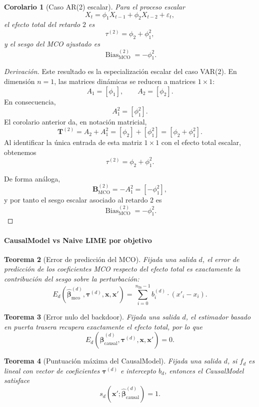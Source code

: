 \documentclass[12pt]{report} %
\newtheorem{theorem}{Teorema}
\newtheorem{corollary}[theorem]{Corolario}
\begin{document}
\begin{corollary}[Caso AR(2) escalar]
    Para el proceso escalar
    $$X_t = \phi_1 X_{t-1} + \phi_2 X_{t-2} + \varepsilon_t,$$
    el efecto total del retardo $2$ es
    $$\tau^{(2)} = \phi_2 + \phi_1^2,$$
    y el sesgo del MCO ajustado es
    $$\operatorname{Bias}_{\mathrm{MCO}}^{(2)} = -\phi_1^2.$$
\end{corollary}
\begin{proof}[Derivación]
    Este resultado es la especialización escalar del caso VAR(2). En dimensión $n=1$, las matrices dinámicas se reducen a matrices $1 \times 1$:
    $$A_1 = [\phi_1], \qquad A_2 = [\phi_2].$$
    En consecuencia,
    $$A_1^2 = [\phi_1^2].$$
    El corolario anterior da, en notación matricial,
    $$\mathbf{T}^{(2)} = A_2 + A_1^2 = [\phi_2] + [\phi_1^2] = [\phi_2 + \phi_1^2].$$
    Al identificar la única entrada de esta matriz $1 \times 1$ con el efecto total escalar, obtenemos
    $$\tau^{(2)} = \phi_2 + \phi_1^2.$$

    De forma análoga,
    $$\mathbf{B}_{\mathrm{MCO}}^{(2)} = -A_1^2 = [-\phi_1^2],$$
    y por tanto el sesgo escalar asociado al retardo $2$ es
    $$\operatorname{Bias}_{\mathrm{MCO}}^{(2)} = -\phi_1^2.$$
\end{proof}

\paragraph{CausalModel vs Naive LIME por objetivo}

\begin{theorem}[Error de predicción del MCO]
    Fijada una salida $d$, el error de predicción de los coeficientes MCO respecto del efecto total es exactamente la contribución del sesgo sobre la perturbación:
    $$E_d\!\left(\widehat{\boldsymbol{\beta}}^{(d)}_{\text{mco}}, \boldsymbol{\tau}^{(d)}, \mathbf{x}, \mathbf{x}'\right) = \sum_{i=0}^{n_{\text{In}}-1} b_i^{(d)} \cdot (x'_i - x_i).$$
\end{theorem}

\begin{theorem}[Error nulo del backdoor]
    Fijada una salida $d$, el estimador basado en puerta trasera recupera exactamente el efecto total, por lo que
    $$E_d\!\left(\widehat{\boldsymbol{\beta}}^{(d)}_{\text{causal}}, \boldsymbol{\tau}^{(d)}, \mathbf{x}, \mathbf{x}'\right) = 0.$$
\end{theorem}

\begin{theorem}[Puntuación máxima del CausalModel]
    Fijada una salida $d$, si $f_d$ es lineal con vector de coeficientes $\boldsymbol{\tau}^{(d)}$ e intercepto $b_d$, entonces el CausalModel satisface
    $$s_d\!\left(\mathbf{x}'; \widehat{\boldsymbol{\beta}}^{(d)}_{\text{causal}}\right) = 1.$$
\end{theorem}
\end{document}
